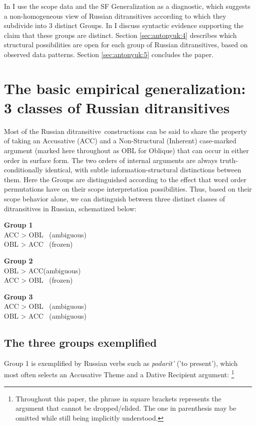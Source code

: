 \documentclass[output=paper,colorlinks,citecolor=brown,nonflat]{./langscibook}
\begin{document}
In  I use the scope data and the SF Generalization as a diagnostic, which suggests a non-homogeneous view of Russian ditransitives according to which they subdivide into 3 distinct Groups. In  I discuss syntactic evidence supporting the claim that these groups are distinct. Section \ref{sec:antonyuk:4} describes which structural possibilities are open for each group of Russian ditransitives, based on observed data patterns. Section \ref{sec:antonyuk:5} concludes the paper. 

\section{The basic empirical generalization: 3 classes of Russian ditransitives}\label{sec:antonyuk:2}

Most of the Russian ditransitive~constructions can be said to share the property of taking an Accusative (ACC) and a Non-Structural (Inherent) case-marked argument (marked here throughout as OBL for Oblique) that can occur in either order in surface form. The two orders of internal arguments are always truth-conditionally identical, with subtle information-structural distinctions between them. Here the Groups are distinguished according to the effect that word order permutations have on their scope interpretation possibilities. Thus, based on their scope behavior alone, we can distinguish between three distinct classes of ditransitives in Russian, schematized below:

\ea%
    \label{ex:antonyuk:9}
    \textbf{Group 1}\\
    ACC > OBL ~(ambiguous)\\
    OBL > ACC ~(frozen)
    \z

\ea%
    \label{ex:antonyuk:10}
    \textbf{Group 2}\\
    OBL > ACC(ambiguous)\\
    ACC > OBL ~(frozen)
    \z

\ea%
    \label{ex:antonyuk:11}
    \textbf{Group 3}\\
    ACC > OBL ~(ambiguous)\\
    OBL > ACC ~(ambiguous)
    \z

\subsection{The three groups exemplified}\label{sec:antonyuk:2.1}

Group 1 is exemplified by Russian verbs such as \textit{podarit’} ('to present’), which most often selects an Accusative Theme and a Dative Recipient argument: \footnote{Throughout this paper, the phrase in square brackets represents the argument that cannot be dropped/elided. The one in parenthesis may be omitted while still being implicitly understood.} 
\end{document}
